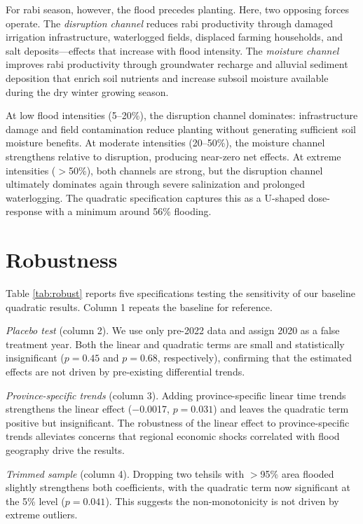 \documentclass[12pt]{article}
\begin{document}
For rabi season, however, the flood precedes planting. Here, two opposing forces operate. The \textit{disruption channel} reduces rabi productivity through damaged irrigation infrastructure, waterlogged fields, displaced farming households, and salt deposits---effects that increase with flood intensity. The \textit{moisture channel} improves rabi productivity through groundwater recharge and alluvial sediment deposition that enrich soil nutrients and increase subsoil moisture available during the dry winter growing season.

At low flood intensities (5--20\%), the disruption channel dominates: infrastructure damage and field contamination reduce planting without generating sufficient soil moisture benefits. At moderate intensities (20--50\%), the moisture channel strengthens relative to disruption, producing near-zero net effects. At extreme intensities ($>$50\%), both channels are strong, but the disruption channel ultimately dominates again through severe salinization and prolonged waterlogging. The quadratic specification captures this as a U-shaped dose-response with a minimum around 56\% flooding.

\section{Robustness}\label{sec:robustness}

Table \ref{tab:robust} reports five specifications testing the sensitivity of our baseline quadratic results. Column 1 repeats the baseline for reference.

\textit{Placebo test} (column 2). We use only pre-2022 data and assign 2020 as a false treatment year. Both the linear and quadratic terms are small and statistically insignificant ($p = 0.45$ and $p = 0.68$, respectively), confirming that the estimated effects are not driven by pre-existing differential trends.

\textit{Province-specific trends} (column 3). Adding province-specific linear time trends strengthens the linear effect ($-$0.0017, $p = 0.031$) and leaves the quadratic term positive but insignificant. The robustness of the linear effect to province-specific trends alleviates concerns that regional economic shocks correlated with flood geography drive the results.

\textit{Trimmed sample} (column 4). Dropping two tehsils with $>$95\% area flooded slightly strengthens both coefficients, with the quadratic term now significant at the 5\% level ($p = 0.041$). This suggests the non-monotonicity is not driven by extreme outliers.
\end{document}
